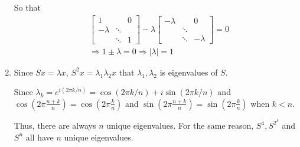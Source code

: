 \documentclass[11pt]{article}
\begin{document}
\begin{enumerate}
			So that
			\begin{align}
				&\begin{bmatrix}
					1 & & 0\\
				  	-\lambda & \ddots & \\
				    & \ddots & 1
				\end{bmatrix} - \lambda \begin{bmatrix}
					-\lambda & & 0\\
				  			 & \ddots & \\
				    & \ddots & -\lambda
				\end{bmatrix} = 0\nonumber\\
				&\Rightarrow 1 \pm \lambda = 0 \Rightarrow |\lambda| = 1\nonumber
			\end{align} 
			\item Since $Sx = \lambda x$, $S^2x = \lambda_1 \lambda_2 x$ that $\lambda_1, \lambda_2$ is eigenvalues of $S$. 
			
				Since $\lambda_k = e^{i(2\pi k / n)} = \cos(2\pi k / n) + i\sin(2\pi k / n)$ and $\cos(2\pi\frac{n + k}{n}) = \cos(2\pi \frac{k}{n})$ and $\sin(2\pi\frac{n + k}{n}) = \sin(2\pi \frac{k}{n})$ when $k < n$.
			
			Thus, there are always $n$ unique eigenvalues. For the same reason, $S^4, S^{2^k}$ and $S^n$ all have $n$ unique eigenvalues.
	\end{enumerate}
\end{document}
